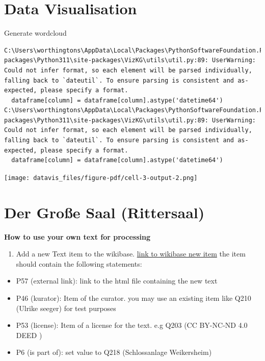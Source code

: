 \documentclass[
  letterpaper,
]{book}
\providecommand{\tightlist}{%
  \setlength{\itemsep}{0pt}\setlength{\parskip}{0pt}}\usepackage{longtable,booktabs,array}
\begin{document}

\chapter{Data Visualisation}\label{data-visualisation}

Generate wordcloud

\begin{verbatim}
C:\Users\worthingtons\AppData\Local\Packages\PythonSoftwareFoundation.Python.3.11_qbz5n2kfra8p0\LocalCache\local-packages\Python311\site-packages\VizKG\utils\util.py:89: UserWarning: Could not infer format, so each element will be parsed individually, falling back to `dateutil`. To ensure parsing is consistent and as-expected, please specify a format.
  dataframe[column] = dataframe[column].astype('datetime64')
C:\Users\worthingtons\AppData\Local\Packages\PythonSoftwareFoundation.Python.3.11_qbz5n2kfra8p0\LocalCache\local-packages\Python311\site-packages\VizKG\utils\util.py:89: UserWarning: Could not infer format, so each element will be parsed individually, falling back to `dateutil`. To ensure parsing is consistent and as-expected, please specify a format.
  dataframe[column] = dataframe[column].astype('datetime64')
\end{verbatim}

\texttt{[image: datavis\_files/figure-pdf/cell-3-output-2.png]}


\chapter{Der Große Saal
(Rittersaal)}\label{der-grouxdfe-saal-rittersaal}

\textbf{How to use your own text for processing}

\begin{enumerate}
\def\labelenumi{\arabic{enumi}.}
\tightlist
\item
  Add a new Text item to the wikibase.
  \href{https://computational-publishing-service.wikibase.cloud/wiki/Special:NewItem}{link
  to wikibase new item} the item should contain the following
  statements:
\end{enumerate}

\begin{itemize}
\tightlist
\item
  P57 (external link): link to the html file containing the new text
\item
  P46 (kurator): Item of the curator. you may use an existing item like
  Q210 (Ulrike seeger) for test purposes
\item
  P53 (license): Item of a license for the text. e.g Q203 (CC BY-NC-ND
  4.0 DEED )
\item
  P6 (is part of): set value to Q218 (Schlossanlage Weikersheim)
\end{itemize}
\end{document}
